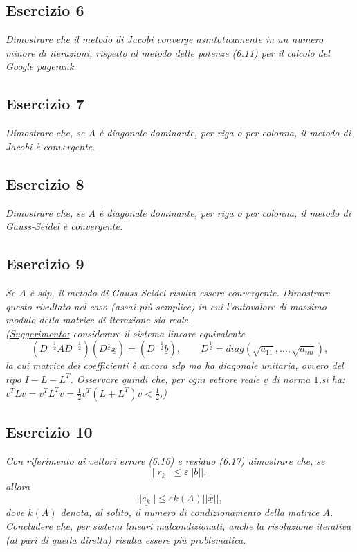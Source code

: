 \subsection{Esercizio 6}
\label{sub:es6}
\emph{Dimostrare che il metodo di Jacobi converge asintoticamente in un numero minore di iterazioni, rispetto al metodo delle potenze (6.11) per il calcolo del \textit{Google pagerank}.}

\subsection{Esercizio 7}
\label{sub:es7}
\emph{Dimostrare che, se $A$ è diagonale dominante, per riga o per colonna, il metodo di Jacobi è convergente.}

\subsection{Esercizio 8}
\label{sub:es8}
\emph{Dimostrare che, se $A$ è diagonale dominante, per riga o per colonna, il metodo di Gauss-Seidel è convergente.}

\subsection{Esercizio 9}
\label{sub:es9}
\emph{Se $A$ è \textit{sdp}, il metodo di Gauss-Seidel risulta essere convergente.
      Dimostrare questo risultato nel caso (assai più semplice) in cui l'autovalore di massimo modulo della matrice di iterazione sia reale.\\
			(\underline{Suggerimento:} considerare il sistema lineare equivalente
			$$(D^{-\frac{1}{2}}AD^{-\frac{1}{2}})(D^{\frac{1}{2}}\underline{x})=(D^{-\frac{1}{2}}\underline{b}),\qquad D^{\frac{1}{2}}=diag(\sqrt{a_{11}},\dots,\sqrt{a_{nn}}),$$
			la cui matrice dei coefficienti è ancora \textit{sdp} ma ha diagonale unitaria,
      ovvero del tipo $I-L-L^T$. Osservare quindi che, per ogni vettore reale $\underline{v}$ di norma $1$,si ha:
      $\underline{v}^TL\underline{v}=\underline{v}^TL^T\underline{v}=\frac{1}{2}\underline{v}^T(L+L^T)\underline{v}<\frac{1}{2}$.)}

\subsection{Esercizio 10}
\label{sub:es10}
\emph{Con riferimento ai vettori errore (6.16) e residuo (6.17) dimostrare che, se
			\begin{equation}
				\label{criterioArrestoSplitting}
				||\underline{r_k}||\leq\varepsilon||\underline{b}||,
			\end{equation}
			allora
			$$||\underline{e_k}||\leq\varepsilon k(A)||\underline{\hat{x}}||,$$
			dove $k(A)$ denota, al solito, il numero di condizionamento della matrice $A$.
      Concludere che, per sistemi lineari malcondizionati, anche la risoluzione iterativa (al pari di quella diretta) risulta essere più problematica.}

